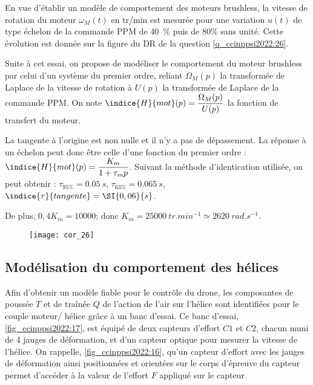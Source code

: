 En vue d’établir un modèle de comportement des moteurs brushless, la vitesse de rotation du
moteur $\omega_M(t)$ en \si{tr/min} est mesurée pour une variation $u(t)$ de type échelon de la commande
PPM de \SI{40}{\%} puis de 80\% sans unité. Cette évolution est donnée sur la figure du DR de la
question \ref{q_ccinppsi2022:26}.

Suite à cet essai, on propose de modéliser le comportement du moteur brushless par celui
d’un système du premier ordre, reliant $\Omega_M(p)$ la transformée de Laplace de la vitesse de rotation à
$U(p)$ la transformée de Laplace de la commande PPM. On note $\indice{H}{mot}(p) = \dfrac{\Omega_M(p)}{
U(p)}$ la fonction de transfert du moteur.
\fi

\ifprof
\begin{corrige}

La tangente à l’origine est non nulle et il n'y a pas de dépassement. La réponse à un échelon peut donc être celle d’une fonction du premier ordre :
$\indice{H}{mot}(p)=\dfrac{K_m}{1+\tau_m p}$. Suivant la méthode d'identication utilisée, on peut obtenir : 
$\tau_{95\%}=\SI{0,05}{s}$, 
$\tau_{63\%}=\SI{0,065}{s}$,
$\indice{\tau}{tangente}  =\SI{0,06}{s}$.

De plus, $0,4 K_m=10000$; donc $K_m=\SI{25000}{tr.min^{-1}} \simeq \SI{2620}{rad.s^{-1}}$.
\begin{figure}[H]
\centering
\texttt{[image: cor\_26]}
\end{figure}

\end{corrige}
\else
\fi

\subsection{Modélisation du comportement des hélices}
\ifprof
\else
Afin d’obtenir un modèle fiable pour le contrôle du drone, les composantes de poussée
$T$ et de traînée $Q$ de l’action de l’air sur l’hélice sont identifiées pour le couple moteur/
hélice grâce à un banc d’essai. Ce banc d’essai, \autoref{fig_ccinppsi2022:17}, est équipé de deux capteurs
d’effort $C1$ et $C2$, chacun muni de 4 jauges de déformation, et d’un capteur optique pour
mesurer la vitesse de l’hélice. On rappelle, \autoref{fig_ccinppsi2022:16}, qu’un capteur d’effort avec les jauges
de déformation ainsi positionnées et orientées sur le corps d’épreuve du capteur permet
d’accéder à la valeur de l’effort $F$ appliqué sur le capteur.
\fi


